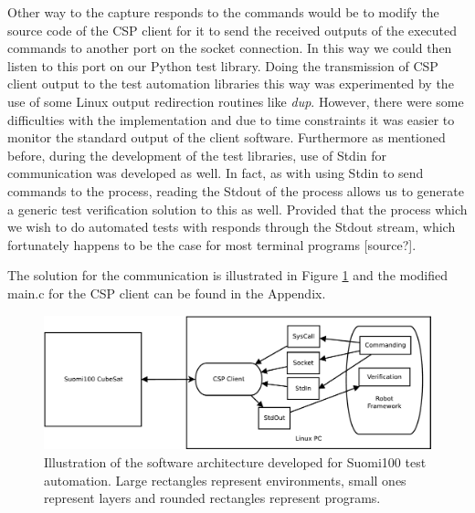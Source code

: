 \documentclass[english,12pt,a4paper,pdftex,elec,utf8]{aaltothesis}
\begin{document}
Other way to the capture responds to the commands would be to modify the source code of the CSP client for it to send the received outputs of the executed commands to another port on the socket connection. In this way we could then listen to this port on our Python test library. Doing the transmission of CSP client output to the test automation libraries this way was experimented by the use of some Linux output redirection routines like \textit{dup}. However, there were some difficulties with the implementation and due to time constraints it was easier to monitor the standard output of the client software. Furthermore as mentioned before, during the development of the test libraries, use of Stdin for communication was developed as well. In fact, as with using Stdin to send commands to the process, reading the Stdout of the process allows us to generate a generic test verification solution to this as well. Provided that the process which we wish to do automated tests with responds through the Stdout stream, which fortunately happens to be the case for most terminal programs [source?].
\par   
The solution for the communication is illustrated in Figure \ref{cspauto} and the modified main.c for the CSP client can be found in the Appendix.
\begin{figure}[h!]
\centering
\includegraphics[scale=0.5]{cspautomation}
\caption{Illustration of the software architecture developed for Suomi100 test automation. Large rectangles represent environments, small ones represent layers and rounded rectangles represent programs.}
\label{cspauto}
\end{figure} 
\end{document}
